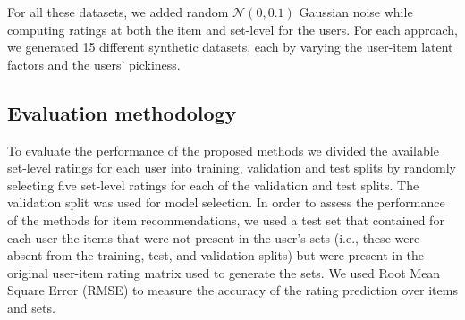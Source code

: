 For all these datasets, we added random $\mathcal{N}(0, 0.1)$ Gaussian noise while computing
ratings at both the item and set-level for the users. 
For each approach, we generated 15 different synthetic datasets, each
by varying the user-item latent factors and the users' pickiness.

\iffalse
We generated five ratings for
a set as per above approaches by choosing at random five different extremal subsets 
and pickiness levels for the users. We repeated this procedure three times by
using a different low rank model and sampling different 1000 users each time, 
hence creating 3 different synthetic datasets. Hence, giving us fifteen splits
for data generated using each of the above approach.  We will refer to these datasets
as \SYNSETSA.
\fi




\subsection{Evaluation methodology}
To evaluate the performance of the proposed methods we divided the available
set-level ratings for each user into training, validation and test splits by randomly
selecting five set-level ratings for each of the validation and test splits. 
The validation split was used for model selection.
In order to assess the performance of the methods for item
recommendations, we used a test set that contained for each user the items that
were not present in the user's sets (i.e., these were absent from the training,
test, and validation splits) but were present in the original user-item rating
matrix used to generate the sets.
We used Root Mean Square Error (RMSE) to measure the accuracy of the rating prediction
over items and sets. 

